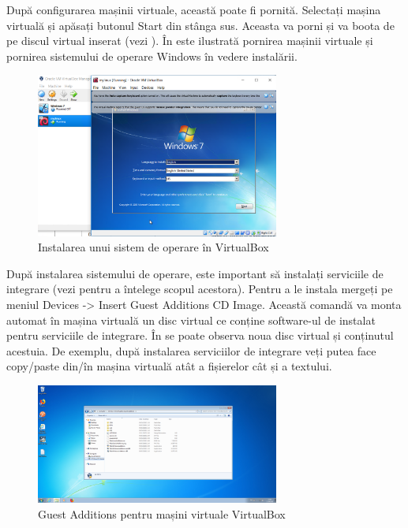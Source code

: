 După configurarea mașinii virtuale, această poate fi pornită. Selectați mașina
virtuală și apăsați butonul Start din stânga sus. Aceasta va porni și va boota
de pe discul virtual inserat (vezi ). În
 este ilustrată pornirea mașinii
virtuale și pornirea sistemului de operare Windows în vedere instalării.

\begin{figure}[!htbp]
	\centering
	\includegraphics[width=8cm]{chapters/14-vm/img/vbox-install-img.png}
	\caption{Instalarea unui sistem de operare în VirtualBox}
	\label{fig:vm-vbox-install}
\end{figure}

După instalarea sistemului de operare, este important să instalați serviciile de
integrare (vezi  pentru a întelege
scopul acestora). Pentru a le instala mergeți pe meniul Devices -> Insert Guest
Additions CD Image. Această comandă va monta automat în mașina virtuală un disc
virtual ce conține software-ul de instalat pentru serviciile de integrare. În
 se poate observa noua disc virtual
și conținutul acestuia. De exemplu, după instalarea serviciilor de integrare
veți putea face copy/paste din/în mașina virtuală atât a fișierelor cât și a
textului.

\begin{figure}[!htbp]
	\centering
	\includegraphics[width=8cm]{chapters/14-vm/img/vbox-additions-img.png}
	\caption{Guest Additions pentru mașini virtuale VirtualBox}
	\label{fig:vm-vbox-additions}
\end{figure}

